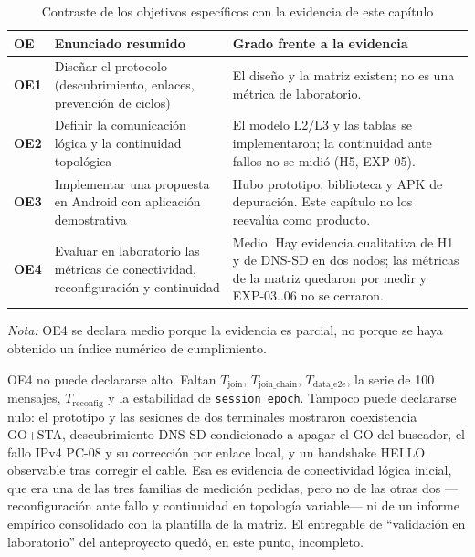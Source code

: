 \documentclass[12pt,oneside]{scrreprt}
\begin{document}
\begin{table}[H]
\centering
\singlespacing
\caption{Contraste de los objetivos específicos con la evidencia de este capítulo}
\label{tab:contraste-oe}
\renewcommand{\arraystretch}{1.15}
\begin{tabularx}{\textwidth}{@{} >{\bfseries}l >{\raggedright\arraybackslash}p{6.6cm} X @{}}
\toprule
OE & Enunciado resumido & Grado frente a la evidencia \\
\midrule
OE1 & Diseñar el protocolo (descubrimiento, enlaces, prevención de ciclos) & El diseño y la matriz existen; no es una métrica de laboratorio. \\
OE2 & Definir la comunicación lógica y la continuidad topológica & El modelo L2/L3 y las tablas se implementaron; la continuidad ante fallos no se midió (H5, EXP-05). \\
OE3 & Implementar una propuesta en Android con aplicación demostrativa & Hubo prototipo, biblioteca y APK de depuración. Este capítulo no los reevalúa como producto. \\
OE4 & Evaluar en laboratorio las métricas de conectividad, reconfiguración y continuidad & Medio. Hay evidencia cualitativa de H1 y de DNS-SD en dos nodos; las métricas de la matriz quedaron por medir y EXP-03..06 no se cerraron. \\
\bottomrule
\end{tabularx}
\par\vspace{0.2cm}
\small \raggedright \textit{Nota:} OE4 se declara medio porque la evidencia es parcial, no porque se haya obtenido un índice numérico de cumplimiento.
\end{table}

OE4 no puede declararse alto. Faltan $T_{\mathrm{join}}$, $T_{\mathrm{join\_chain}}$, $T_{\mathrm{data\_e2e}}$, la serie de 100 mensajes, $T_{\mathrm{reconfig}}$ y la estabilidad de \texttt{session\_epoch}. Tampoco puede declararse nulo: el prototipo y las sesiones de dos terminales mostraron coexistencia GO+STA, descubrimiento DNS-SD condicionado a apagar el GO del buscador, el fallo IPv4 PC-08 y su corrección por enlace local, y un handshake HELLO observable tras corregir el cable. Esa es evidencia de conectividad lógica inicial, que era una de las tres familias de medición pedidas, pero no de las otras dos ---reconfiguración ante fallo y continuidad en topología variable--- ni de un informe empírico consolidado con la plantilla de la matriz. El entregable de \enquote{validación en laboratorio} del anteproyecto quedó, en este punto, incompleto.
\end{document}
